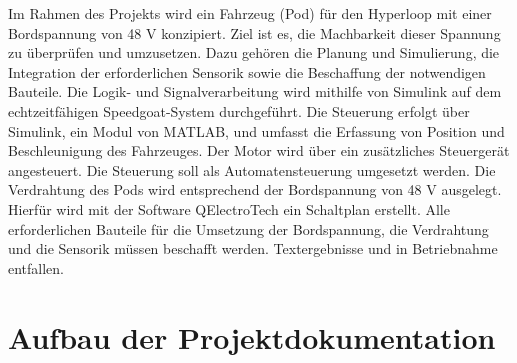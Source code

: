 Im Rahmen des Projekts wird ein Fahrzeug (Pod) für den Hyperloop mit einer Bordspannung von 48 V konzipiert. Ziel ist es, die Machbarkeit dieser Spannung zu überprüfen und umzusetzen. Dazu gehören die Planung und Simulierung, die Integration der erforderlichen Sensorik sowie die Beschaffung der notwendigen Bauteile. Die Logik- und Signalverarbeitung wird mithilfe von Simulink auf dem echtzeitfähigen Speedgoat-System durchgeführt.
Die Steuerung erfolgt über Simulink, ein Modul von MATLAB, und umfasst die Erfassung von Position und Beschleunigung des Fahrzeuges. Der Motor wird über ein zusätzliches Steuergerät angesteuert. Die Steuerung soll als Automatensteuerung umgesetzt werden.
Die Verdrahtung des Pods wird entsprechend der Bordspannung von 48 V ausgelegt. Hierfür wird mit der Software QElectroTech ein Schaltplan erstellt.
Alle erforderlichen Bauteile für die Umsetzung der Bordspannung, die Verdrahtung und die Sensorik müssen beschafft werden.
Textergebnisse und in Betriebnahme entfallen.



\section{Aufbau der Projektdokumentation}
\label{section:Aufbau}




